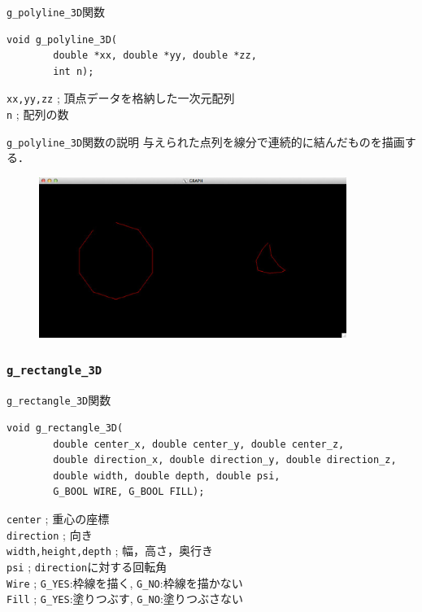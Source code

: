 \documentclass[platex,a4paper,12pt]{jsarticle}%
\begin{document}
\begin{itembox}[l]{\texttt{g\_polyline\_3D}関数}
\begin{verbatim}
void g_polyline_3D(
        double *xx, double *yy, double *zz,
        int n);
\end{verbatim}
\verb|xx,yy,zz| ; 頂点データを格納した一次元配列\\
\verb|n| ; 配列の数
\end{itembox}

\begin{itembox}[l]{\texttt{g\_polyline\_3D}関数の説明}
与えられた点列を線分で連続的に結んだものを描画する．
\end{itembox}

\begin{figure}[htb]
\centering
	\includegraphics[width=100mm]{./Figures/eps/Canvas_g_polyline.eps}
\end{figure}



\clearpage
\subsubsection{\texttt{g\_rectangle\_3D}}

\begin{itembox}[l]{\texttt{g\_rectangle\_3D}関数}
\begin{verbatim}
void g_rectangle_3D(
        double center_x, double center_y, double center_z,
        double direction_x, double direction_y, double direction_z,
        double width, double depth, double psi,
        G_BOOL WIRE, G_BOOL FILL);
\end{verbatim}
\verb|center| ; 重心の座標\\
\verb|direction| ; 向き\\
\verb|width,height,depth| ; 幅，高さ，奥行き\\
\verb|psi| ; \verb|direction|に対する回転角\\
\verb|Wire| ; \verb|G_YES|:枠線を描く, \verb|G_NO|:枠線を描かない \\
\verb|Fill| ; \verb|G_YES|:塗りつぶす, \verb|G_NO|:塗りつぶさない 
\end{itembox}
\end{document}
